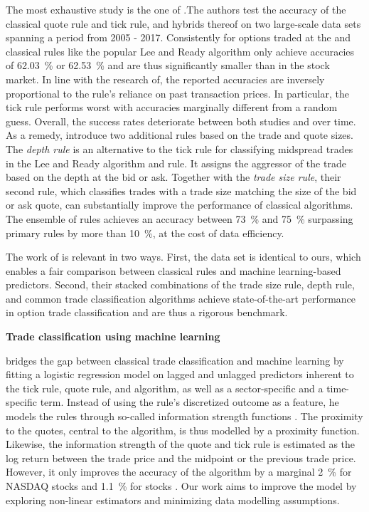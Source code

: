 The most exhaustive study is the one of \textcite[1--39]{grauerOptionTradeClassification2022}.The authors test the accuracy of the classical quote rule and tick rule, and hybrids thereof on two large-scale data sets spanning a period from 2005 - 2017. Consistently for options traded at the  and  classical rules like the popular Lee and Ready algorithm only achieve accuracies of \SI{62.03}{\percent} or \SI{62.53}{\percent} and are thus significantly smaller than in the stock market. In line with the research of\textcite[886]{savickasInferringDirectionOption2003}, the reported accuracies are inversely proportional to the rule's reliance on past transaction prices. In particular, the tick rule performs worst with accuracies marginally different from a random guess. Overall, the success rates deteriorate between both studies and over time. As a remedy, \textcite[14--17]{grauerOptionTradeClassification2022} introduce two additional rules based on the trade and quote sizes. The \emph{depth rule} is an alternative to the tick rule for classifying midspread trades in the Lee and Ready algorithm and  rule. It assigns the aggressor of the trade based on the depth at the bid or ask. Together with the \emph{trade size rule}, their second rule, which classifies trades with a trade size matching the size of the bid or ask quote, can substantially improve the performance of classical algorithms. The ensemble of rules achieves an accuracy between \SI{73}{\percent} and \SI{75}{\percent} surpassing primary rules by more than \SI{10}{\percent}, at the cost of data efficiency.

The work of \textcite[1--39]{grauerOptionTradeClassification2022} is relevant in two ways. First, the data set is identical to ours, which enables a fair comparison between classical rules and machine learning-based predictors. Second, their stacked combinations of the trade size rule, depth rule, and common trade classification algorithms achieve state-of-the-art performance in option trade classification and are thus a rigorous benchmark.

\textbf{Trade classification using machine learning}

\textcite[5]{rosenthalModelingTradeDirection2012} bridges the gap between classical trade classification and machine learning by fitting a logistic regression model on lagged and unlagged predictors inherent to the tick rule, quote rule, and  algorithm, as well as a sector-specific and a time-specific term. Instead of using the rule's discretized outcome as a feature, he models the rules through so-called information strength functions \textcite[481--482]{rosenthalModelingTradeDirection2012}. The proximity to the quotes, central to the  algorithm, is thus modelled by a proximity function. Likewise, the information strength of the quote and tick rule is estimated as the log return between the trade price and the midpoint or the previous trade price. However, it only improves the accuracy of the  algorithm by a marginal \SI{2}{\percent} for \gls{NASDAQ} stocks and \SI{1.1}{\percent} for  stocks \autocite[15]{rosenthalModelingTradeDirection2012}. Our work aims to improve the model by exploring non-linear estimators and minimizing data modelling assumptions.

